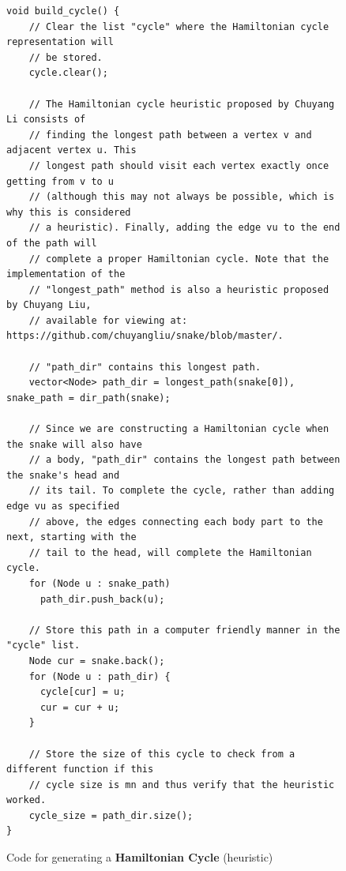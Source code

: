 \documentclass[12pt]{article}
\begin{document}
\begin{figure}[!h]
\begin{lstlisting}
void build_cycle() {
	// Clear the list "cycle" where the Hamiltonian cycle representation will
	// be stored.
    cycle.clear();
    
    // The Hamiltonian cycle heuristic proposed by Chuyang Li consists of
    // finding the longest path between a vertex v and adjacent vertex u. This
    // longest path should visit each vertex exactly once getting from v to u
    // (although this may not always be possible, which is why this is considered
    // a heuristic). Finally, adding the edge vu to the end of the path will 
    // complete a proper Hamiltonian cycle. Note that the implementation of the
    // "longest_path" method is also a heuristic proposed by Chuyang Liu,
    // available for viewing at: https://github.com/chuyangliu/snake/blob/master/.
    
    // "path_dir" contains this longest path.
    vector<Node> path_dir = longest_path(snake[0]), snake_path = dir_path(snake);
    
    // Since we are constructing a Hamiltonian cycle when the snake will also have
    // a body, "path_dir" contains the longest path between the snake's head and
    // its tail. To complete the cycle, rather than adding edge vu as specified
    // above, the edges connecting each body part to the next, starting with the
    // tail to the head, will complete the Hamiltonian cycle.
    for (Node u : snake_path)
      path_dir.push_back(u);
    
    // Store this path in a computer friendly manner in the "cycle" list.
    Node cur = snake.back();
    for (Node u : path_dir) {
      cycle[cur] = u;
      cur = cur + u;
    }
    
    // Store the size of this cycle to check from a different function if this
    // cycle size is mn and thus verify that the heuristic worked.
    cycle_size = path_dir.size();
}
\end{lstlisting}
\caption{Code for generating a \textbf{Hamiltonian Cycle} (heuristic) \cite{liu2019}}
\label{fig:cycle_code}
\end{figure}
\end{document}
